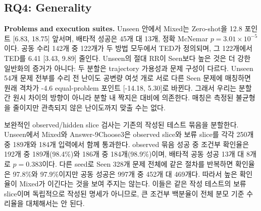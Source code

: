 \documentclass[10pt,conference]{IEEEtran}
\begin{document}
\subsection{RQ4: Generality}
\label{sec:generality}
\noindent\textbf{Problems and execution suites.} Unseen 안에서 Mixed는 Zero-shot을 12.8 포인트 [6.83, 18.75] 앞서며, 배타적 성공은 45개 대 13개, 정확 McNemar \(p=3.01\times10^{-5}\)이다. 공동 수리 142개 중 122개가 두 방법 모두에서 TED가 정의되며, 그 122개에서 TED를 6.41 [3.43, 9.89] 줄인다. Unseen의 절대 RR이 Seen보다 높은 것은 더 강한 일반화의 증거가 아니다: 두 분할은 trajectory 가용성과 문제 구성이 다르다. Unseen 54개 문제 전부를 수리 전 난이도 공변량 여섯 개로 서로 다른 Seen 문제에 매칭하면 원래 격차가 -4.6 equal-problem 포인트 [-14.18, 5.30]로 바뀐다. 그래서 우리는 분할 간 원시 차이의 방향이 아니라 분할 내 짝지은 대비에 의존한다. 매칭은 측정된 불균형을 줄이지만 관측되지 않은 난이도까지 맞출 수는 없다.

보완적인 observed/hidden slice 검사는 기존의 작성된 테스트 묶음을 분할한다. Unseen에서 Mixed와 Answer-9Choose3은 observed slice와 보류 slice를 각각 250개 중 189개와 184개 입력에서 함께 통과한다. observed 묶음 성공 중 조건부 확인율은 192개 중 189개(98.4\%)와 186개 중 184개(98.9\%)이며, 배타적 공동 성공 13개 대 8개로 \(p=0.383\)이다. 다른 seed로 Seen 328개 문제 전체에 같은 절차를 반복하면 확인율은 97.8\%와 97.9\%이지만 공동 성공은 997개 중 452개 대 469개다. 따라서 높은 확인율이 Mixed가 이긴다는 것을 보여 주지는 않는다. 이들은 같은 작성 테스트의 보류 slice이며 독립적으로 작성된 명세가 아니므로, 큰 조건부 백분율이 전체 분모 기준 수리율을 대체해서는 안 된다.
\end{document}

